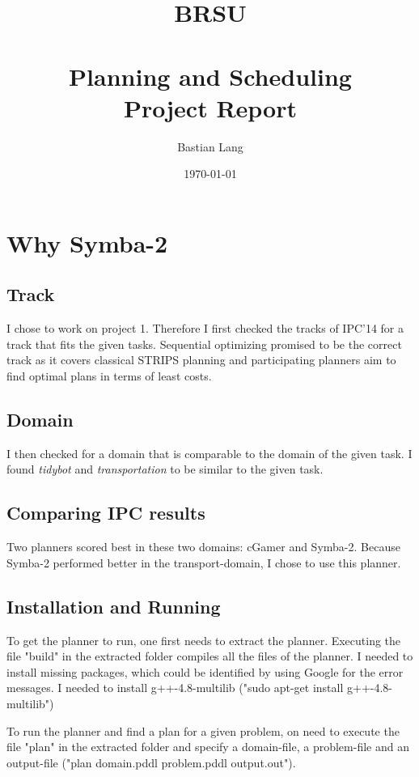 \documentclass[paper=a4, fontsize=11pt]{scrartcl} %
\title{	
\normalfont \normalsize 
\textsc{BRSU} \\ [25pt] %
\horrule{0.5pt} \\[0.4cm] %
\huge Planning and Scheduling\\Project Report %
\horrule{2pt} \\[0.5cm] %
}
\author{Bastian Lang} %
\date{\normalsize\today} %
\numberwithin{equation}{section} %
\numberwithin{figure}{section} %
\numberwithin{table}{section} %
\begin{document}
\maketitle %

\section{Why Symba-2}
\subsection{Track}
I chose to work on project 1. Therefore I first checked the tracks of IPC'14 for a track that fits the given tasks. Sequential optimizing promised to be the correct track as it covers classical STRIPS planning and participating planners aim to find optimal plans in terms of least costs.
\subsection{Domain}
I then checked for a domain that is comparable to the domain of the given task. I found \textit{tidybot} and \textit{transportation} to be similar to the given task.

\subsection{Comparing IPC results}
Two planners scored best in these two domains: cGamer and Symba-2. Because Symba-2 performed better in the transport-domain, I chose to use this planner.

\subsection{Installation and Running}
To get the planner to run, one first needs to extract the planner. 
Executing the file "build" in the extracted folder compiles all the files of the planner.
I needed to install missing packages, which could be identified by using Google for the error messages. I needed to install g++-4.8-multilib ("sudo apt-get install g++-4.8-multilib")\vspace{5mm}

To run the planner and find a plan for a given problem, on need to execute the file "plan" in the extracted folder and specify a domain-file, a problem-file and an output-file ("plan domain.pddl problem.pddl output.out").\vspace{5mm}
\end{document}

